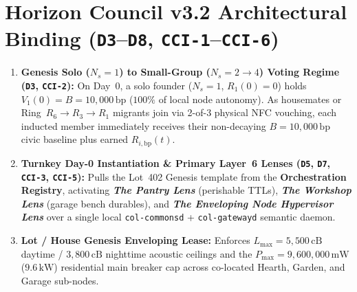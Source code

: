\section{Horizon Council v3.2 Architectural Binding (\texttt{D3}--\texttt{D8}, \texttt{CCI-1}--\texttt{CCI-6})}
\begin{enumerate}
    \item \textbf{Genesis Solo ($N_s = 1$) to Small-Group ($N_s = 2 \to 4$) Voting Regime (\texttt{D3}, \texttt{CCI-2}):} On Day~0, a solo founder ($N_s = 1$, $R_1(0) = 0$) holds $V_1(0) = B = 10{,}000\,\mathrm{bp}$ ($100\%$ of local node autonomy). As housemates or Ring~$R_6 \to R_3 \to R_1$ migrants join via 2-of-3 physical NFC vouching, each inducted member immediately receives their non-decaying $B = 10{,}000\,\mathrm{bp}$ civic baseline plus earned $R_{i,\mathrm{bp}}(t)$.
    \item \textbf{Turnkey Day-0 Instantiation \& Primary Layer~6 Lenses (\texttt{D5}, \texttt{D7}, \texttt{CCI-3}, \texttt{CCI-5}):} Pulls the Lot~402 Genesis template from the \textbf{Orchestration Registry}, activating \textbf{\textit{The Pantry Lens}} (perishable TTLs), \textbf{\textit{The Workshop Lens}} (garage bench durables), and \textbf{\textit{The Enveloping Node Hypervisor Lens}} over a single local \texttt{col-commonsd} + \texttt{col-gatewayd} semantic daemon.
    \item \textbf{Lot / House Genesis Enveloping Lease:} Enforces $L_{\max} = 5{,}500\,\mathrm{cB}$ daytime / $3{,}800\,\mathrm{cB}$ nighttime acoustic ceilings and the $P_{\max} = 9{,}600{,}000\,\mathrm{mW}$ ($9.6\,\mathrm{kW}$) residential main breaker cap across co-located Hearth, Garden, and Garage sub-nodes.
\end{enumerate}

